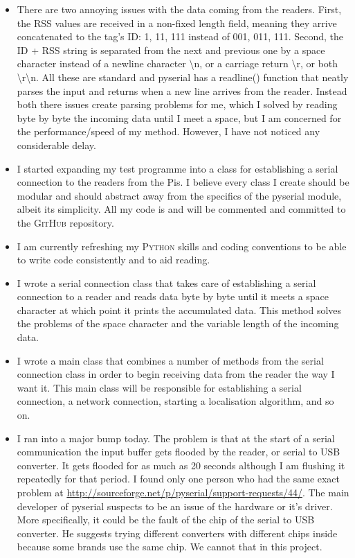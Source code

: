 \documentclass[a4paper,12pt]{article}
\begin{document}
\begin{itemize}
	\item There are two annoying issues with the data coming from the readers. First, the RSS values are received in a non-fixed length field, meaning they arrive concatenated to the tag's ID: 1, 11, 111 instead of 001, 011, 111. Second, the ID + RSS string is separated from the next and previous one by a space character instead of a newline character \textbackslash{}n, or a carriage return \textbackslash{}r, or both \textbackslash{}r\textbackslash{}n. All these are standard and \textsf{pyserial} has a \textsf{readline()} function that neatly parses the input and returns when a new line arrives from the reader. Instead both there issues create parsing problems for me, which I solved by reading byte by byte the incoming data until I meet a space, but I am concerned for the performance/speed of my method. However, I have not noticed any considerable delay.
	\item I started expanding my test programme into a class for establishing a serial connection to the readers from the Pis. I believe every class I create should be modular and should abstract away from the specifics of the \textsf{pyserial} module, albeit its simplicity. All my code is and will be commented and committed to the \textsc{GitHub} repository.
	\item I am currently refreshing my \textsc{Python} skills and coding conventions to be able to write code consistently  and to aid reading.
	\item I wrote a serial connection class that takes care of establishing a serial connection to a reader and reads data byte by byte until it meets a space character at which point it prints the accumulated data. This method solves the problems of the space character and the variable length of the incoming data.
	\item I wrote a main class that combines a number of methods from the serial connection class in order to begin receiving data from the reader the way I want it. This main class will be responsible for establishing a serial connection, a network connection, starting a localisation algorithm, and so on.
	\item I ran into a major bump today. The problem is that at the start of a serial communication the input buffer gets flooded by the reader, or serial to USB converter. It gets flooded for as much as 20 seconds although I am flushing it repeatedly for that period. I found only one person who had the same exact problem at \url{http://sourceforge.net/p/pyserial/support-requests/44/}. The main developer of \textsf{pyserial} suspects to be an issue of the hardware or it's driver. More specifically, it could be the fault of the chip of the serial to USB converter. He suggests trying different converters with different chips inside because some brands use the same chip. We cannot that in this project.
	

\end{itemize}
\end{document}
